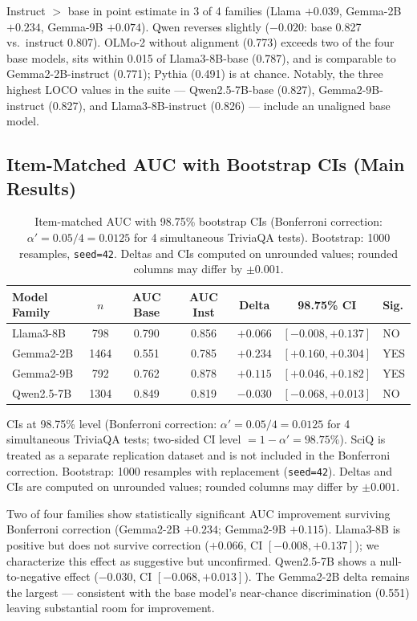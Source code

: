 \documentclass[11pt]{article}
\begin{document}
Instruct $>$ base in point estimate in 3 of 4 families (Llama $+0.039$, Gemma-2B $+0.234$, Gemma-9B $+0.074$). Qwen reverses slightly ($-0.020$: base 0.827 vs.\ instruct 0.807). OLMo-2 without alignment (0.773) exceeds two of the four base models, sits within 0.015 of Llama3-8B-base (0.787), and is comparable to Gemma2-2B-instruct (0.771); Pythia (0.491) is at chance. Notably, the three highest LOCO values in the suite --- Qwen2.5-7B-base (0.827), Gemma2-9B-instruct (0.827), and Llama3-8B-instruct (0.826) --- include an unaligned base model.

\subsection{Item-Matched AUC with Bootstrap CIs (Main Results)}

\begin{table}[h]
\centering
\begin{tabular}{lcccccl}
\toprule
Model Family & $n$ & AUC Base & AUC Inst & Delta & 98.75\% CI & Sig. \\
\midrule
Llama3-8B  & 798  & 0.790 & 0.856 & $+0.066$ & $[-0.008, +0.137]$ & NO  \\
Gemma2-2B  & 1464 & 0.551 & 0.785 & $+0.234$ & $[+0.160, +0.304]$ & YES \\
Gemma2-9B  & 792  & 0.762 & 0.878 & $+0.115$ & $[+0.046, +0.182]$ & YES \\
Qwen2.5-7B & 1304 & 0.849 & 0.819 & $-0.030$ & $[-0.068, +0.013]$ & NO  \\
\bottomrule
\end{tabular}
\caption{Item-matched AUC with 98.75\% bootstrap CIs (Bonferroni correction: $\alpha' = 0.05/4 = 0.0125$ for 4 simultaneous TriviaQA tests). Bootstrap: 1000 resamples, \texttt{seed=42}. Deltas and CIs computed on unrounded values; rounded columns may differ by $\pm0.001$.}
\label{tab:main}
\end{table}

CIs at 98.75\% level (Bonferroni correction: $\alpha' = 0.05/4 = 0.0125$ for 4 simultaneous TriviaQA tests; two-sided CI level $= 1 - \alpha' = 98.75\%$). SciQ is treated as a separate replication dataset and is not included in the Bonferroni correction. Bootstrap: 1000 resamples with replacement (\texttt{seed=42}). Deltas and CIs are computed on unrounded values; rounded columns may differ by $\pm0.001$.

Two of four families show statistically significant AUC improvement surviving Bonferroni correction (Gemma2-2B $+0.234$; Gemma2-9B $+0.115$). Llama3-8B is positive but does not survive correction ($+0.066$, CI $[-0.008, +0.137]$); we characterize this effect as suggestive but unconfirmed. Qwen2.5-7B shows a null-to-negative effect ($-0.030$, CI $[-0.068, +0.013]$). The Gemma2-2B delta remains the largest --- consistent with the base model's near-chance discrimination (0.551) leaving substantial room for improvement.
\end{document}
